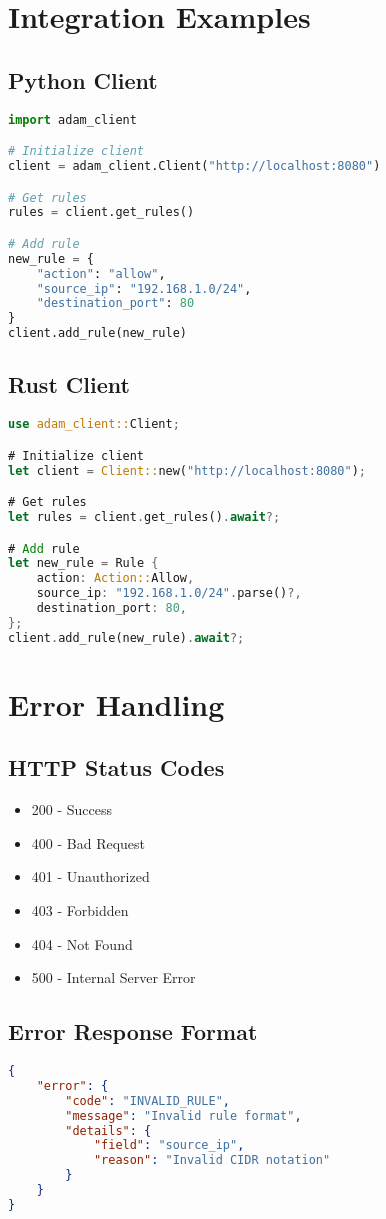 \documentclass{article}
\begin{document}
\section{Integration Examples}

\subsection{Python Client}
\begin{lstlisting}[language=python]
import adam_client

# Initialize client
client = adam_client.Client("http://localhost:8080")

# Get rules
rules = client.get_rules()

# Add rule
new_rule = {
    "action": "allow",
    "source_ip": "192.168.1.0/24",
    "destination_port": 80
}
client.add_rule(new_rule)
\end{lstlisting}

\subsection{Rust Client}
\begin{lstlisting}[language=rust]
use adam_client::Client;

# Initialize client
let client = Client::new("http://localhost:8080");

# Get rules
let rules = client.get_rules().await?;

# Add rule
let new_rule = Rule {
    action: Action::Allow,
    source_ip: "192.168.1.0/24".parse()?,
    destination_port: 80,
};
client.add_rule(new_rule).await?;
\end{lstlisting}

\section{Error Handling}

\subsection{HTTP Status Codes}
\begin{itemize}
    \item 200 - Success
    \item 400 - Bad Request
    \item 401 - Unauthorized
    \item 403 - Forbidden
    \item 404 - Not Found
    \item 500 - Internal Server Error
\end{itemize}

\subsection{Error Response Format}
\begin{lstlisting}[language=json]
{
    "error": {
        "code": "INVALID_RULE",
        "message": "Invalid rule format",
        "details": {
            "field": "source_ip",
            "reason": "Invalid CIDR notation"
        }
    }
}
\end{lstlisting}
\end{document}

